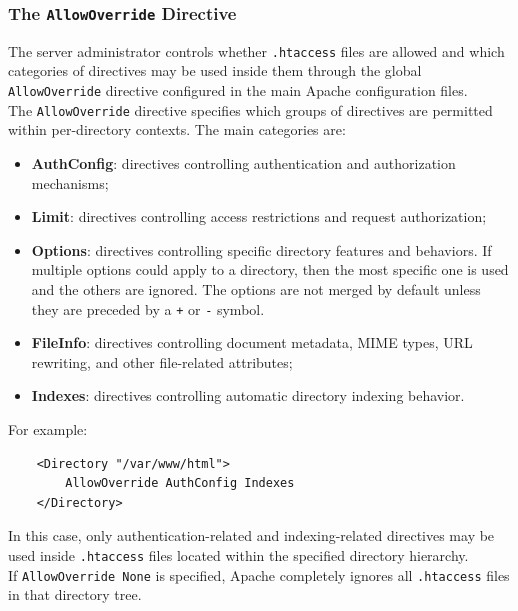 \documentclass{scrbook}
\begin{document}
	\subsubsection{The \texttt{AllowOverride} Directive}
	
	The server administrator controls whether \texttt{.htaccess} files are allowed and which categories of directives may be used inside them through the global \texttt{AllowOverride} directive configured in the main Apache configuration files.\\
	
	The \texttt{AllowOverride} directive specifies which groups of directives are permitted within per-directory contexts. The main categories are:
	
	\begin{itemize}
		\item \textbf{AuthConfig}: directives controlling authentication and authorization mechanisms;
		
		\item \textbf{Limit}: directives controlling access restrictions and request authorization;
		
		\item \textbf{Options}: directives controlling specific directory features and behaviors. If multiple options could apply to a directory, then the most specific one is used and the others are ignored. The options are not merged by default unless they are preceded by a \texttt{+} or \texttt{-} symbol.
		
		\item \textbf{FileInfo}: directives controlling document metadata, MIME types, URL rewriting, and other file-related attributes;
		
		\item \textbf{Indexes}: directives controlling automatic directory indexing behavior.
	\end{itemize}
	
	For example:
	\begin{lstlisting}
	<Directory "/var/www/html">
		AllowOverride AuthConfig Indexes
	</Directory>
	\end{lstlisting}
	
	In this case, only authentication-related and indexing-related directives may be used inside \texttt{.htaccess} files located within the specified directory hierarchy.\\
	
	If \texttt{AllowOverride None} is specified, Apache completely ignores all \texttt{.htaccess} files in that directory tree.
	
\end{document}
